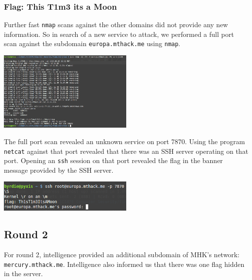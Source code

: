\documentclass[10pt,a4paper,titlepage]{article}
\begin{document}
\subsubsection{Flag: This T1m3 its a Moon}
Further fast \texttt{nmap} scans against the other domains did not provide any new information. So in search of a new service to attack, we performed a full port scan against the subdomain \texttt{europa.mthack.me} using \texttt{nmap}.
\begin{center}
\includegraphics[width=0.5\textwidth]{europa_flags/Th1sTi1m3ItsAMoon/nmap}
\end{center}
The full port scan revealed an unknown service on port 7870. Using the program \texttt{netcat} against that port revealed that there was an SSH server operating on that port. Opening an \texttt{ssh} session on that port revealed the flag in the banner message provided by the SSH server.
\begin{center}
\includegraphics[width=0.5\textwidth]{europa_flags/Th1sTi1m3ItsAMoon/flag}
\end{center}
\subsection{Round 2}
For round 2, intelligence \cite{test} provided an additional subdomain of MHK's network: \texttt{mercury.mthack.me}. Intelligence also informed us that there was one flag hidden in the server.
\end{document}
